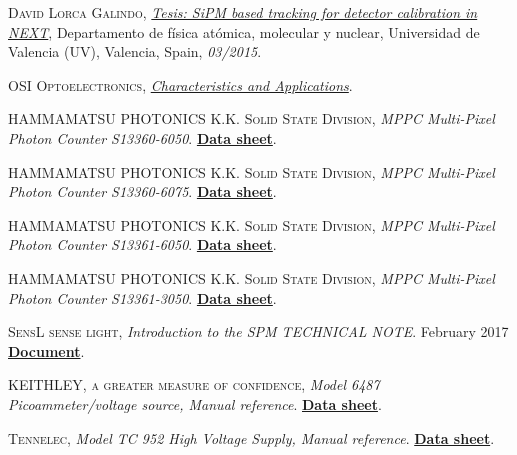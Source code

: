 \begin{thebibliography}{100}
 \textsc{David Lorca Galindo},
\href{https://dialnet.unirioja.es/servlet/tesis?codigo=101465}{\textit{Tesis: SiPM based tracking for detector calibration in NEXT}}, Departamento de física atómica, molecular y nuclear, Universidad de Valencia (UV), Valencia, Spain, \textit{03/2015}.

 \textsc{OSI Optoelectronics}, 
\href{https://osioptoelectronics.com/standard-products/default.aspx?gclid=EAIaIQobChMIkYrLif_37QIVDNTtCh3NuwpkEAAYASAAEgKMJ_D_BwE}{\textit{Characteristics and Applications}}.

 \textsc{HAMMAMATSU PHOTONICS K.K. Solid State Division},
\textit{MPPC Multi-Pixel Photon Counter S13360-6050}. \href{https://www.hamamatsu.com/eu/en/product/type/S13360-6050CS/index.html}{\textbf{Data sheet}}.

 \textsc{HAMMAMATSU PHOTONICS K.K. Solid State Division},
\textit{MPPC Multi-Pixel Photon Counter S13360-6075}. \href{https://www.hamamatsu.com/eu/en/product/type/S13360-6075CS/index.html}{\textbf{Data sheet}}.

 \textsc{HAMMAMATSU PHOTONICS K.K. Solid State Division},
\textit{MPPC Multi-Pixel Photon Counter S13361-6050}. \href{https://www.hamamatsu.com/us/en/product/type/S13361-6050AE-04/index.html}{\textbf{Data sheet}}.

 \textsc{HAMMAMATSU PHOTONICS K.K. Solid State Division},
\textit{MPPC Multi-Pixel Photon Counter S13361-3050}. \href{https://www.hamamatsu.com/jp/en/product/type/S13361-3050AE-08/index.html}{\textbf{Data sheet}}.

 \textsc{SensL sense light},
\textit{Introduction to the SPM TECHNICAL NOTE}. February 2017 \href{https://sensl.com/}{\textbf{Document}}.

 \textsc{KEITHLEY, a greater measure of confidence},
\textit{Model 6487 Picoammeter/voltage source, Manual reference}. \href{https://pdf.directindustry.com/pdf/keithley-instruments/6487-picoammeter-voltage-source/1438-619876.html}{\textbf{Data sheet}}.

 \textsc{Tennelec},
\textit{Model TC 952 High Voltage Supply, Manual reference}. \href{https://groups.nscl.msu.edu/nscl_library/manuals/tennelec/tennelec.htm}{\textbf{Data sheet}}.


\end{thebibliography}
